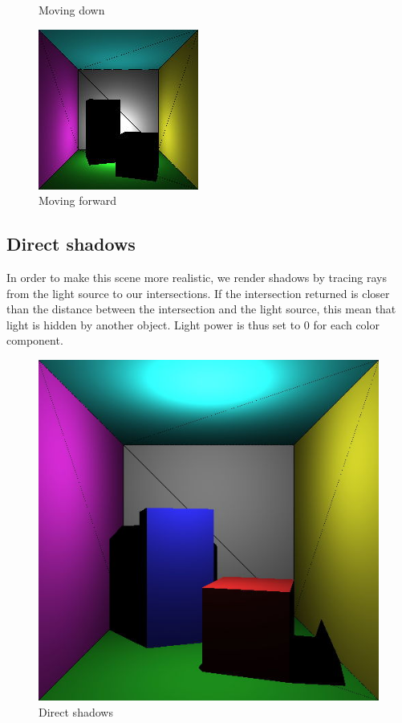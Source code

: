 \begin{figure}[H]
    \caption{Moving down}
\endminipage\hfill
{}
    \centering
    \includegraphics[width=\linewidth]{img/light_col3.jpg}
    \caption{Moving forward}
\endminipage\hfill
\end{figure}


\subsection{Direct shadows}
In order to make this scene more realistic, we render shadows by tracing rays from the light source to our intersections. If the intersection returned is closer than the distance between the intersection and the light source, this mean that light is hidden by another object. Light power is thus set to 0 for each color component.

\begin{figure}[H]
\centering
\includegraphics[width=0.4\linewidth]{img/shadows.jpg}
\caption{Direct shadows}
\end{figure}

